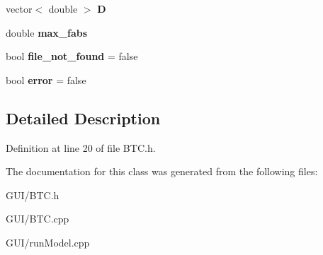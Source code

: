 \begin{DoxyCompactItemize}
vector$<$ double $>$ {\bfseries D}
\item 
\mbox{\label{class_c_b_t_c_a700a0837b3db3518990fdf2b0c3f963a}} 
double {\bfseries max\+\_\+fabs}
\item 
\mbox{\label{class_c_b_t_c_ac1687a4f5aa5910c1b7645dddab09773}} 
bool {\bfseries file\+\_\+not\+\_\+found} = false
\item 
\mbox{\label{class_c_b_t_c_a02145e19a7323eaf7676021043680523}} 
bool {\bfseries error} = false
\end{DoxyCompactItemize}


\subsection{Detailed Description}


Definition at line 20 of file B\+T\+C.\+h.



The documentation for this class was generated from the following files\+:\begin{DoxyCompactItemize}
\item 
G\+U\+I/B\+T\+C.\+h\item 
G\+U\+I/B\+T\+C.\+cpp\item 
G\+U\+I/run\+Model.\+cpp\end{DoxyCompactItemize}
